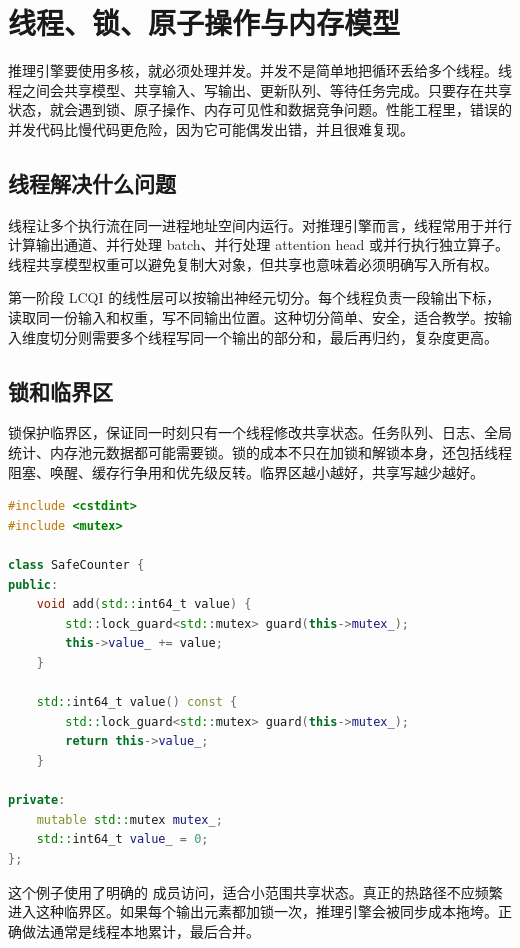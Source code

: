 \chapter{线程、锁、原子操作与内存模型}

推理引擎要使用多核，就必须处理并发。并发不是简单地把循环丢给多个线程。线程之间会共享模型、共享输入、写输出、更新队列、等待任务完成。只要存在共享状态，就会遇到锁、原子操作、内存可见性和数据竞争问题。性能工程里，错误的并发代码比慢代码更危险，因为它可能偶发出错，并且很难复现。

\section{线程解决什么问题}

线程让多个执行流在同一进程地址空间内运行。对推理引擎而言，线程常用于并行计算输出通道、并行处理 batch、并行处理 attention head 或并行执行独立算子。线程共享模型权重可以避免复制大对象，但共享也意味着必须明确写入所有权。

第一阶段 LCQI 的线性层可以按输出神经元切分。每个线程负责一段输出下标，读取同一份输入和权重，写不同输出位置。这种切分简单、安全，适合教学。按输入维度切分则需要多个线程写同一个输出的部分和，最后再归约，复杂度更高。

\section{锁和临界区}

锁保护临界区，保证同一时刻只有一个线程修改共享状态。任务队列、日志、全局统计、内存池元数据都可能需要锁。锁的成本不只在加锁和解锁本身，还包括线程阻塞、唤醒、缓存行争用和优先级反转。临界区越小越好，共享写越少越好。

\begin{lstlisting}[language=C++,caption={用互斥锁保护共享计数器}]
#include <cstdint>
#include <mutex>

class SafeCounter {
public:
    void add(std::int64_t value) {
        std::lock_guard<std::mutex> guard(this->mutex_);
        this->value_ += value;
    }

    std::int64_t value() const {
        std::lock_guard<std::mutex> guard(this->mutex_);
        return this->value_;
    }

private:
    mutable std::mutex mutex_;
    std::int64_t value_ = 0;
};
\end{lstlisting}

这个例子使用了明确的  成员访问，适合小范围共享状态。真正的热路径不应频繁进入这种临界区。如果每个输出元素都加锁一次，推理引擎会被同步成本拖垮。正确做法通常是线程本地累计，最后合并。


